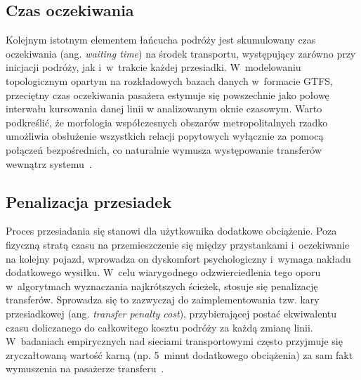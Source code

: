 \documentclass{pracamgr}
\begin{document}
\subsection{Czas oczekiwania}\label{subsection:waiting}
Kolejnym istotnym elementem łańcucha podróży jest skumulowany czas oczekiwania (ang. \textit{waiting time}) na środek transportu, występujący zarówno przy inicjacji podróży, jak i~w~trakcie każdej przesiadki. W~modelowaniu topologicznym opartym na rozkładowych bazach danych w~formacie GTFS, przeciętny czas oczekiwania pasażera estymuje się powszechnie jako połowę interwału kursowania danej linii w analizowanym oknie czasowym. Warto podkreślić, że morfologia współczesnych obszarów metropolitalnych rzadko umożliwia obsłużenie wszystkich relacji popytowych wyłącznie za pomocą połączeń bezpośrednich, co naturalnie wymusza występowanie transferów wewnątrz systemu~\cite{LUO2019102505, metropolitan}.

\subsection{Penalizacja przesiadek}\label{subsection:przesiadki}
Proces przesiadania się stanowi dla użytkownika dodatkowe obciążenie. Poza fizyczną stratą czasu na przemieszczenie się między przystankami i~oczekiwanie na kolejny pojazd, wprowadza on dyskomfort psychologiczny i~wymaga nakładu dodatkowego wysiłku. W~celu wiarygodnego odzwierciedlenia tego oporu w~algorytmach wyznaczania najkrótszych ścieżek, stosuje się penalizację transferów. Sprowadza się to zazwyczaj do zaimplementowania tzw. kary przesiadkowej (ang. \textit{transfer penalty cost}), przybierającej postać ekwiwalentu czasu doliczanego do całkowitego kosztu podróży za każdą zmianę linii. W~badaniach empirycznych nad sieciami transportowymi często przyjmuje się zryczałtowaną wartość karną (np. 5~minut dodatkowego obciążenia) za sam fakt wymuszenia na pasażerze transferu~\cite{LUO2019102505}.

\end{document}
